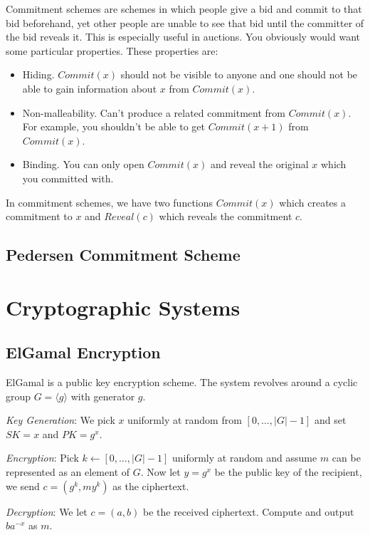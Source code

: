 \documentclass[psamsfonts]{amsart}
\begin{document}
Commitment schemes are schemes in which people give a bid and commit to that bid beforehand, yet other people are unable to see that bid until the committer of the bid reveals it. This is especially useful in auctions. You obviously would want some particular properties. These properties are:
\begin{itemize}
  \item Hiding. $Commit(x)$ should not be visible to anyone and one should not be able to gain information about $x$ from $Commit(x)$.
  \item Non-malleability. Can't produce a related commitment from $Commit(x)$. For example, you shouldn't be able to get $Commit(x+1)$ from $Commit(x)$.
  \item Binding. You can only open $Commit(x)$ and reveal the original $x$ which you committed with.
\end{itemize}

In commitment schemes, we have two functions $Commit(x)$ which creates a commitment to $x$ and $Reveal(c)$ which reveals the commitment $c$.

\subsection{Pedersen Commitment Scheme}


\newpage

\section{Cryptographic Systems}

\subsection{ElGamal Encryption}

ElGamal is a public key encryption scheme. The system revolves around a cyclic group $G = \langle g \rangle$ with generator $g$.

\emph{Key Generation}: We pick $x$ uniformly at random from $[0, \ldots, |G|-1]$ and set $SK = x$ and $PK = g^x$.

\emph{Encryption}: Pick $k \leftarrow [0, \ldots, |G|-1]$ uniformly at random and assume $m$ can be represented as an element of $G$. Now let $y = g^x$ be the public key of the recipient, we send $c = (g^k, m y^k)$ as the ciphertext.

\emph{Decryption}: We let $c = (a,b)$ be the received ciphertext. Compute and output $b a^{-x}$ as $m$.
\end{document}
